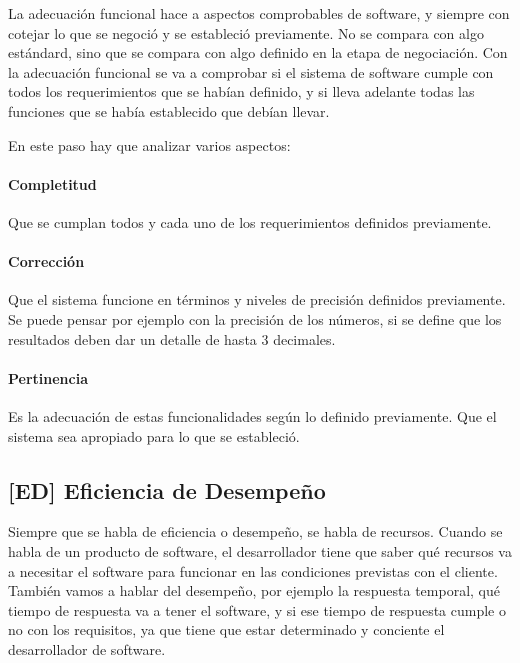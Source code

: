 La adecuación funcional hace a aspectos comprobables de software, y
siempre con cotejar lo que se negoció y se estableció previamente. No se
compara con algo estándard, sino que se compara con algo definido en la
etapa de negociación. Con la adecuación funcional se va a comprobar si
el sistema de software cumple con todos los requerimientos que se habían
definido, y si lleva adelante todas las funciones que se había
establecido que debían llevar.

En este paso hay que analizar varios aspectos:

\hypertarget{completitud}{%
\paragraph{Completitud}\label{completitud}}
  Que se cumplan todos y cada uno de los requerimientos definidos previamente.
\hypertarget{correccion}{%
\paragraph{Corrección}\label{correccion}}
 Que el sistema funcione en términos y niveles de
  precisión definidos previamente. Se puede pensar por ejemplo con la
  precisión de los números, si se define que los resultados deben dar un
  detalle de hasta 3 decimales.
\hypertarget{pertinencia}{%
\paragraph{Pertinencia}\label{pertinencia}}
  Es la adecuación de estas funcionalidades según
  lo definido previamente. Que el sistema sea apropiado para lo que se
  estableció.
\hypertarget{eficiencia-de-desempeuxf1o-ed}{%
\subsection{%
{[}ED{]}
Eficiencia de Desempeño
}\label{eficiencia-de-desempeuxf1o-ed}}

Siempre que se habla de eficiencia o desempeño, se habla de recursos.
Cuando se habla de un producto de software, el desarrollador tiene que
saber qué recursos va a necesitar el software para funcionar en las
condiciones previstas con el cliente. También vamos a hablar del
desempeño, por ejemplo la respuesta temporal, qué tiempo de respuesta va
a tener el software, y si ese tiempo de respuesta cumple o no con los
requisitos, ya que tiene que estar determinado y conciente el
desarrollador de software.

